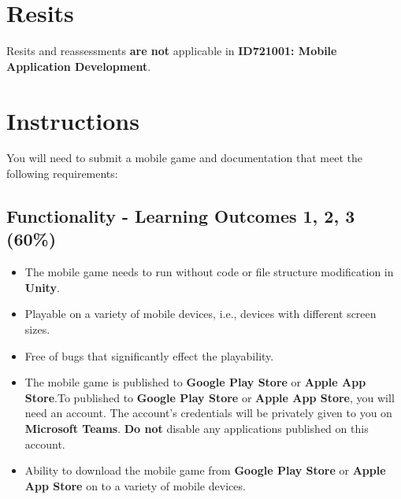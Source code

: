 \documentclass{article}
\begin{document}
\section*{Resits}
Resits and reassessments \textbf{are not} applicable in \textbf{ID721001: Mobile Application Development}.

\section*{Instructions}
You will need to submit a mobile game and documentation that meet the following requirements:

\subsection*{Functionality - Learning Outcomes 1, 2, 3 (60\%)}
\begin{itemize}
	\item The mobile game needs to run without code or file structure modification in \textbf{Unity}.
	\item Playable on a variety of mobile devices, i.e., devices with different screen sizes.
	\item Free of bugs that significantly effect the playability.
	\item The mobile game is published to \textbf{Google Play Store} or \textbf{Apple App Store}.To published to \textbf{Google Play Store} or \textbf{Apple App Store}, you will need an account. The account's credentials will be privately given to you on \textbf{Microsoft Teams}. \textbf{Do not} disable any applications published on this account.
	\item Ability to download the mobile game from \textbf{Google Play Store} or \textbf{Apple App Store} on to a variety of mobile devices.
\end{itemize}
\end{document}
